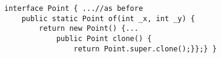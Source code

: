 \begin{lstlisting}
interface Point { ...//as before
    public static Point of(int _x, int _y) {
        return new Point() {...
            public Point clone() {
                return Point.super.clone();}};} }
\end{lstlisting}

%
%
%
